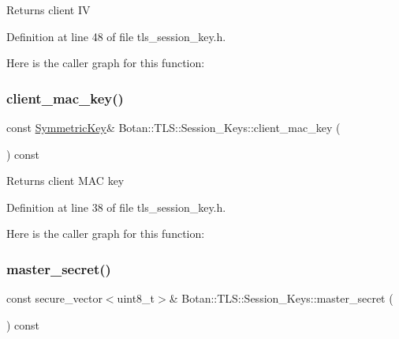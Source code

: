 \begin{DoxyReturn}{Returns}
client IV 
\end{DoxyReturn}


Definition at line 48 of file tls\+\_\+session\+\_\+key.\+h.

Here is the caller graph for this function\+:
\mbox{\label{class_botan_1_1_t_l_s_1_1_session___keys_a01e452a544ad91cda683c74cc7eec21c}} 
\subsubsection{\texorpdfstring{client\+\_\+mac\+\_\+key()}{client\_mac\_key()}}
{\footnotesize\ttfamily const \mbox{\hyperlink{namespace_botan_a89cf6c3513428f524454d01830221a88}{Symmetric\+Key}}\& Botan\+::\+T\+L\+S\+::\+Session\+\_\+\+Keys\+::client\+\_\+mac\+\_\+key (\begin{DoxyParamCaption}{ }\end{DoxyParamCaption}) const\hspace{0.3cm}{\ttfamily [inline]}}

\begin{DoxyReturn}{Returns}
client M\+AC key 
\end{DoxyReturn}


Definition at line 38 of file tls\+\_\+session\+\_\+key.\+h.

Here is the caller graph for this function\+:
\mbox{\label{class_botan_1_1_t_l_s_1_1_session___keys_a94bb969a64e883fb85be1c90b1f31966}} 
\subsubsection{\texorpdfstring{master\+\_\+secret()}{master\_secret()}}
{\footnotesize\ttfamily const secure\+\_\+vector$<$uint8\+\_\+t$>$\& Botan\+::\+T\+L\+S\+::\+Session\+\_\+\+Keys\+::master\+\_\+secret (\begin{DoxyParamCaption}{ }\end{DoxyParamCaption}) const\hspace{0.3cm}{\ttfamily [inline]}}

